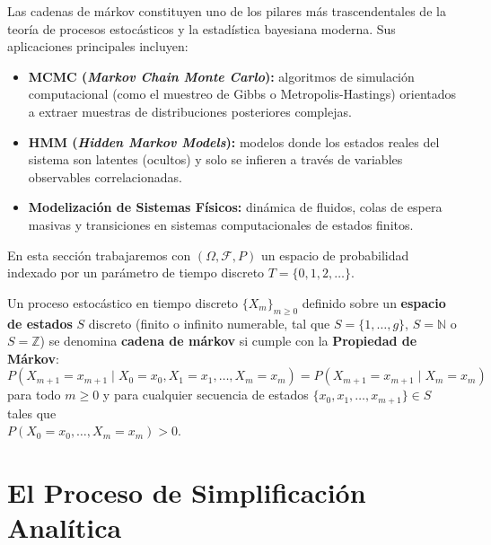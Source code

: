 \noindent
Las cadenas de márkov constituyen uno de los pilares más trascendentales de la teoría de procesos estocásticos y la estadística bayesiana moderna. Sus aplicaciones principales incluyen:
\begin{itemize}
    \item \textbf{MCMC (\textit{Markov Chain Monte Carlo}):} algoritmos de simulación computacional (como el muestreo de Gibbs o Metropolis-Hastings) orientados a extraer muestras de distribuciones posteriores complejas.
    \item \textbf{HMM (\textit{Hidden Markov Models}):} modelos donde los estados reales del sistema son latentes (ocultos) y solo se infieren a través de variables observables correlacionadas.
    \item \textbf{Modelización de Sistemas Físicos:} dinámica de fluidos, colas de espera masivas y transiciones en sistemas computacionales de estados finitos.
\end{itemize}
En esta sección trabajaremos con $(\Omega, \mathcal{F}, P)$ un espacio de probabilidad indexado por un parámetro de tiempo discreto $T = \{0, 1, 2, \dots\}$.

\begin{definicion}
    Un proceso estocástico en tiempo discreto $\{X_m\}_{m \geq 0}$ definido sobre un \textbf{espacio de estados} $S$ discreto (finito o infinito numerable, tal que $S = \{1, \dots, g\}$, $S = \mathbb{N}$ o $S = \mathbb{Z}$) se denomina \textbf{cadena de márkov} si cumple con la \textbf{Propiedad de Márkov}:
    \begin{equation*}
        P(X_{m+1} = x_{m+1} \mid X_0 = x_0, X_1 = x_1, \dots, X_m = x_m) = P(X_{m+1} = x_{m+1} \mid X_m = x_m)
    \end{equation*}
    para todo $m \geq 0$ y para cualquier secuencia de estados $\{x_0, x_1, \dots, x_{m+1}\} \in S$ tales que \\ \mbox{$P(X_0 = x_0, \dots, X_m = x_m) > 0$}.
\end{definicion}


\section{El Proceso de Simplificación Analítica}

